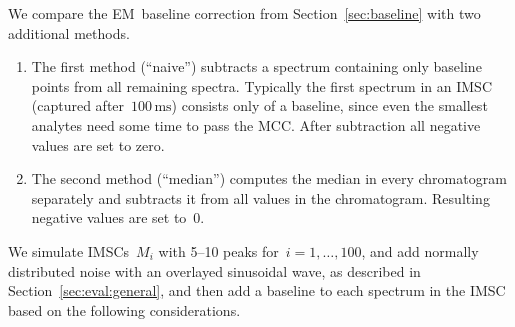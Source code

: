 \documentclass{article}
\begin{document}
We compare the EM~baseline correction from Section~\ref{sec:baseline} with two additional methods.
\begin{enumerate}
\item
The first method (``naive'') subtracts a spectrum containing only baseline points from all remaining spectra.
Typically the first spectrum in an IMSC (captured after~$100\,\text{ms}$) consists only of a baseline, since even the smallest analytes need some time to pass the MCC.
After subtraction all negative values are set to zero.
\item
The second method (``median'') computes the median in every chromatogram separately and subtracts it from all values in the chromatogram.
Resulting negative values are set to~$0$.
\end{enumerate}

We simulate IMSCs~$M_i$ with 5--10 peaks for~$i=1,\dots,100$, and add normally distributed noise with an overlayed sinusoidal wave, as described in Section~\ref{sec:eval:general}, and then add a baseline to each spectrum in the IMSC based on the following considerations.
\end{document}
